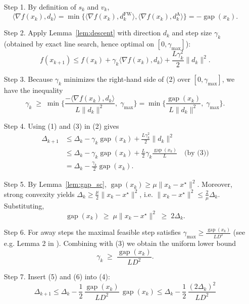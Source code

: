 \documentclass{article}
\newcommand{\gap}{\operatorname{gap}}
\newcommand{\grad}{\nabla}
\begin{document}
\begin{enumerate}
\item[Step 1.]  By definition of $s_k$ and $v_k$,
\[
\langle\grad f(x_k),d_k\rangle
= \min\big\{\langle\grad f(x_k),d^{\text{FW}}_k\rangle,
      \langle\grad f(x_k),d^{\text{A}}_k\rangle\big\}
= -\gap(x_k).                                   \tag{1}
\]
\item[Step 2.]  Apply Lemma~\ref{lem:descent} with direction $d_k$ and step
size $\gamma_k$ (obtained by exact line search, hence optimal on
$[0,\gamma_{\max}]$):
\[
f(x_{k+1}) \le f(x_k) + \gamma_k\langle\grad f(x_k),d_k\rangle
          + \frac{L\gamma_k^{2}}{2}\|d_k\|^{2}.                \tag{2}
\]
\item[Step 3.]  Because $\gamma_k$ minimizes the right‑hand side of (2)
over $[0,\gamma_{\max}]$, we have the inequality
\[
\gamma_k \;\ge\; \min\!\Big\{\frac{-\langle\grad f(x_k),d_k\rangle}
                               {L\|d_k\|^{2}},\;\gamma_{\max}\Big\}
= \min\!\Big\{\frac{\gap(x_k)}{L\|d_k\|^{2}},\;\gamma_{\max}\Big\}. \tag{3}
\]
\item[Step 4.]  Using (1) and (3) in (2) gives
\[
\begin{aligned}
\Delta_{k+1}
&\le \Delta_k - \gamma_k\gap(x_k)
   + \frac{L\gamma_k^{2}}{2}\|d_k\|^{2}                                     \\
&\le \Delta_k - \gamma_k\gap(x_k)
   + \frac{L}{2}\gamma_k\frac{\gap(x_k)}{L}    \quad\text{(by (3))}        \\
&= \Delta_k - \frac{\gamma_k}{2}\gap(x_k).                                 \tag{4}
\end{aligned}
\]
\item[Step 5.]  By Lemma~\ref{lem:gap_sc},
$\gap(x_k)\ge \mu\|x_k-x^\star\|^{2}$.  Moreover, strong convexity yields
$\Delta_k \ge \frac{\mu}{2}\|x_k-x^\star\|^{2}$, i.e.
$\|x_k-x^\star\|^{2}\le \frac{2}{\mu}\Delta_k$.  Substituting,
\[
\gap(x_k) \;\ge\; \mu\|x_k-x^\star\|^{2}
               \;\ge\; 2\Delta_k .                                          \tag{5}
\]
\item[Step 6.]  For away steps the maximal feasible step satisfies
$\gamma_{\max}\ge \frac{\gap(x_k)}{L D^{2}}$ (see e.g. Lemma 2 in
\cite{lacoste2015global}).  Combining with (3) we obtain the uniform lower
bound
\[
\gamma_k \;\ge\; \frac{\gap(x_k)}{L D^{2}} .                                   \tag{6}
\]
\item[Step 7.]  Insert (5) and (6) into (4):
\[
\Delta_{k+1}
\le \Delta_k - \frac{1}{2}\,\frac{\gap(x_k)}{L D^{2}}\,\gap(x_k)
\le \Delta_k - \frac{1}{2}\,\frac{(2\Delta_k)^{2}}{L D^{2}}
\]
\end{enumerate}
\end{document}
